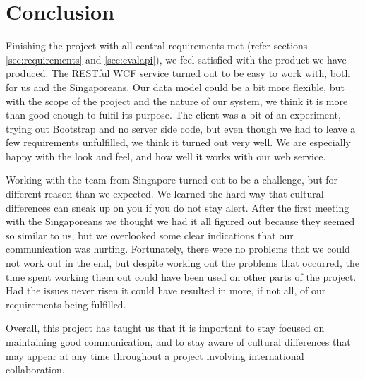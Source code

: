 \section{Conclusion}
Finishing the project with all central requirements met (refer sections
\ref{sec:requirements} and \ref{sec:evalapi}), we feel satisfied with the product
we have produced. 
The RESTful WCF service turned out to be easy to work with,
both for us and the Singaporeans. Our data model could be a bit more flexible, but
with the scope of the project and the nature of our system, we think it is more than good
enough to fulfil its purpose.
The client was a bit of an experiment, trying out Bootstrap and no server side code,
but even though we had to leave a few requirements unfulfilled, we think it 
turned out very well. We are especially happy with the look and feel, and how well it works with our web service.

Working with the team from Singapore turned out to be a challenge, but for 
different reason than we expected. We learned the hard way that 
cultural differences can sneak up on you if you do not stay alert. After the first meeting with the Singaporeans we
thought we had it all figured out because they
seemed so similar to us, but we overlooked some clear indications that our communication
was hurting.
Fortunately, there were no problems that we could not work out in the end, but
despite working out the problems that occurred, the time spent working them out
could have been used on other parts of the project. 
Had the issues never risen it could have resulted in more, if not all, of our requirements being fulfilled.

Overall, this project has taught us that it is important to stay focused on maintaining good 
communication, and to stay aware of cultural differences that may 
appear at any time throughout a project involving international collaboration.

